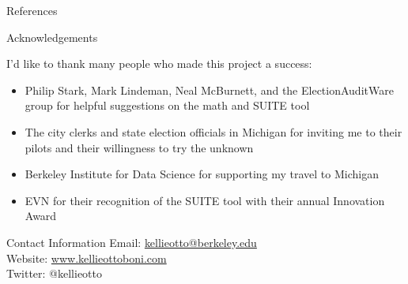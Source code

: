\documentclass[final]{beamer}
\newlength{\onecolwid}
\begin{document}
\begin{frame}[t]
\begin{columns}[t]
\begin{column}{\onecolwid}
\begin{block}{References}

\nocite{*} %
\small{
\vspace{0.75in}}

\end{block}
%
%

\begin{block}{Acknowledgements}

I'd like to thank many people who made this project a success:
\begin{itemize}
\item Philip Stark, Mark Lindeman, Neal McBurnett, and the ElectionAuditWare group for helpful suggestions on the math and SUITE tool
\item The city clerks and state election officials in Michigan for inviting me to their pilots and their willingness to try the unknown
\item Berkeley Institute for Data Science for supporting my travel to Michigan
\item EVN for their recognition of the SUITE tool with their annual Innovation Award
\end{itemize}

\end{block}



\begin{alertblock}{Contact Information}
Email: \href{mailto:kellieotto@berkeley.edu}{kellieotto@berkeley.edu} \\
Website: \href{www.kellieottoboni.com}{www.kellieottoboni.com}\\
Twitter: @kellieotto
\end{alertblock}




\end{column} %

\end{columns} %

\end{frame} %
\end{document}
